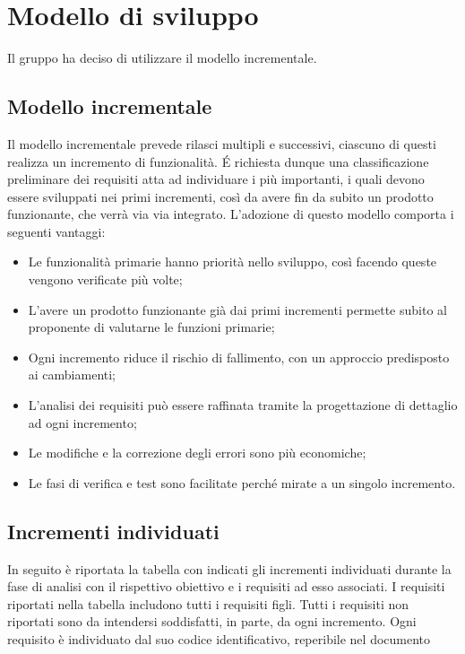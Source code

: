\section{Modello di sviluppo}
Il gruppo ha deciso di utilizzare il modello incrementale.
\subsection{Modello incrementale}
Il modello incrementale prevede rilasci multipli e successivi, ciascuno di questi realizza un incremento di funzionalità.
É richiesta dunque una classificazione preliminare dei requisiti atta ad individuare i più importanti, i quali devono essere sviluppati nei primi incrementi, così da avere fin da subito un prodotto funzionante, che verrà via via integrato.
L'adozione di questo modello comporta i seguenti vantaggi:
\begin{itemize}
\item Le funzionalità primarie hanno priorità nello sviluppo, così facendo queste vengono verificate più volte;
\item L'avere un prodotto funzionante già dai primi incrementi permette subito al proponente di valutarne le funzioni primarie;
\item Ogni incremento riduce il rischio di fallimento, con un approccio predisposto ai cambiamenti;
\item L'analisi dei requisiti può essere raffinata tramite la progettazione di dettaglio ad ogni incremento;
\item Le modifiche e la correzione degli errori sono più economiche;
\item Le fasi di verifica e test sono facilitate perché mirate a un singolo incremento.
\end{itemize}
\subsection{Incrementi individuati}
In seguito è riportata la tabella con indicati gli incrementi individuati durante la fase di analisi con il rispettivo obiettivo e i requisiti ad esso associati.
I requisiti riportati nella tabella includono tutti i requisiti figli. Tutti i requisiti non riportati sono da intendersi soddisfatti, in parte, da ogni incremento.
Ogni requisito è individuato dal suo codice identificativo, reperibile nel documento \AdR


